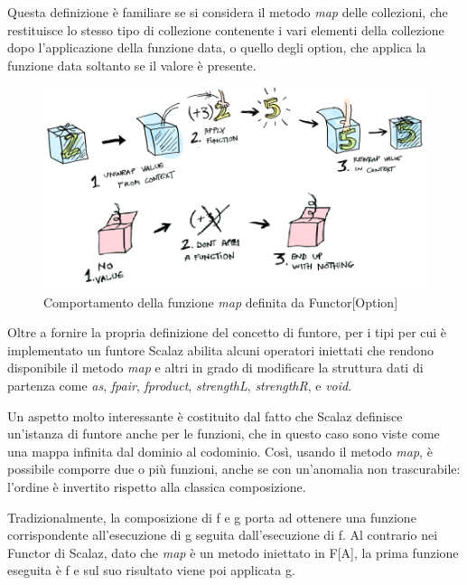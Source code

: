 Questa definizione è familiare se si considera il metodo \textit{map} delle collezioni, che restituisce lo stesso tipo di collezione contenente i vari elementi della collezione dopo l'applicazione della funzione data, o quello degli option, che applica la funzione data soltanto se il valore è presente.

\begin{figure}[th]
\centering
\includegraphics[scale=0.65]{images/functor}
\decoRule
\caption[functor]{Comportamento della funzione \textit{map} definita da Functor[Option] \cite{FunctorsApplicativesMonads}}
\end{figure}

Oltre a fornire la propria definizione del concetto di funtore, per i tipi per cui è implementato un funtore Scalaz abilita alcuni operatori iniettati che rendono disponibile il metodo \textit{map} e altri in grado di modificare la struttura dati di partenza come \textit{as}, \textit{fpair}, \textit{fproduct}, \textit{strengthL}, \textit{strengthR}, e \textit{void}.

Un aspetto molto interessante è costituito dal fatto che Scalaz definisce un'istanza di funtore anche per le funzioni, che in questo caso sono viste come una mappa infinita dal dominio al codominio. Così, usando il metodo \textit{map}, è possibile comporre due o più funzioni, anche se con un'anomalia non trascurabile: l'ordine è invertito rispetto alla classica composizione.

Tradizionalmente, la composizione di f e g porta ad ottenere una funzione corrispondente all'esecuzione di g seguita dall'esecuzione di f. Al contrario nei Functor di Scalaz, dato che \textit{map} è un metodo iniettato in F[A], la prima funzione eseguita è f e sul suo risultato viene poi applicata g.



